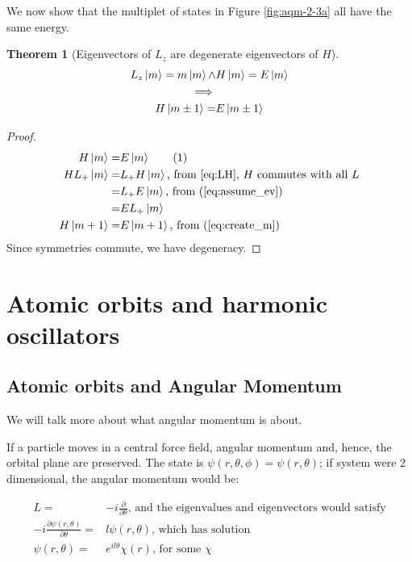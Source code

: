 \documentclass[]{article}
\newcommand\numberthis{\addtocounter{equation}{1}\tag{\theequation}}
\newtheorem{thm}{Theorem}
\begin{document}
 We now show that the multiplet of states in Figure \ref{fig:aqm-2-3a} all have the same energy. 

\begin{thm}[Eigenvectors of $L_z$ are degenerate eigenvectors of $H$]
	\begin{align*}
	L_z \ket{m} = m \ket{m} \land& H \ket{m} = E \ket{m}\\
	 \implies&\\
	  H \ket{m \pm 1} =& E \ket{m \pm 1}
	\end{align*}
\end{thm} 
\begin{proof}
	\begin{align*}
	H \ket{m} =& E \ket{m} \numberthis \label{eq:assume_ev}\\
	H L_+ \ket{m} =& L_+ H \ket{m} \text{, from \eqref{eq:LH}, $H$ commutes with all $L$}\\
	=& L_+ E \ket{m} \text{, from (\ref{eq:assume_ev})}\\
	=& E L_+  \ket{m}\\
	H \ket{m+1} =& E \ket{m+1} \text{, from (\ref{eq:create_m})}
	\end{align*}
	Since symmetries commute, we have degeneracy.
\end{proof}

\section{Atomic orbits and harmonic oscillators}

\subsection{Atomic orbits and Angular Momentum}

We will talk more about what angular momentum is about.

If a particle moves in a central force field, angular momentum and, hence, the orbital plane are preserved. The state is $\psi(r,\theta,\phi)= \psi(r,\theta)$; if system were 2 dimensional, the angular momentum would be:

\begin{align*}
	L =& -i \frac{\partial}{\partial \theta} \text{, and the eigenvalues and eigenvectors would satisfy}\\
	-i \frac{\partial \psi(r,\theta)}{\partial \theta} =& l \psi(r,\theta) \text{, which has solution}\\
	\psi(r,\theta) =& e^{i l \theta} \chi(r) \text{, for some $\chi$}
\end{align*}
\end{document}
